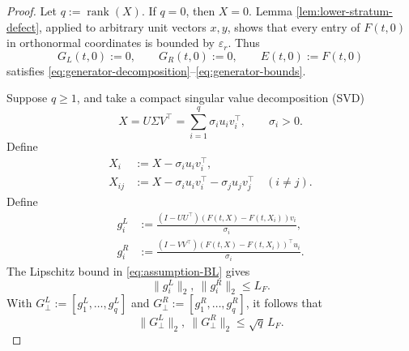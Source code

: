 \documentclass[]{article}
\numberwithin{equation}{section}
\theoremstyle{plain}
\theoremstyle{remark}
\numberwithin{algorithm}{section}
\newcommand{\eps}{\varepsilon}
\newcommand{\rank}{\operatorname{rank}}
\begin{document}
\begin{proof}
Let \(q:=\rank(X)\).  If \(q=0\), then \(X=0\).  Lemma
\ref{lem:lower-stratum-defect}, applied to arbitrary unit vectors \(x,y\),
shows that every entry of \(F(t,0)\) in orthonormal coordinates is bounded
by \(\eps_r\).  Thus
\begin{equation}\label{eq:zero-generator-case}
 G_L(t,0):=0,\qquad G_R(t,0):=0,\qquad E(t,0):=F(t,0)
\end{equation}
satisfies \eqref{eq:generator-decomposition}--\eqref{eq:generator-bounds}.

Suppose \(q\ge1\), and take a compact singular value decomposition (SVD)
\begin{equation}\label{eq:generator-svd}
 X=U\Sigma V^\top
  =\sum_{i=1}^q\sigma_i u_i v_i^\top,
 \qquad \sigma_i>0.
\end{equation}
Define
\begin{align}
 X_i&:=X-\sigma_i u_i v_i^\top,                       \label{eq:delete-one}\\
 X_{ij}&:=X-\sigma_i u_i v_i^\top-\sigma_j u_j v_j^\top
 \quad(i\ne j).                                      \label{eq:delete-two}
\end{align}
Define
\begin{align}
 g_i^L&:=\frac{(I-UU^\top)(F(t,X)-F(t,X_i))v_i}{\sigma_i},
                                                               \label{eq:left-generator-column}\\
 g_i^R&:=\frac{(I-VV^\top)(F(t,X)-F(t,X_i))^\top u_i}{\sigma_i}.
                                                               \label{eq:right-generator-column}
\end{align}
The Lipschitz bound in \eqref{eq:assumption-BL} gives
\begin{equation}\label{eq:normal-generator-bounds}
 \|g_i^L\|_2,\ \|g_i^R\|_2\le L_F.
\end{equation}
With
\(G_\perp^L:=[g_1^L,\ldots,g_q^L]\) and
\(G_\perp^R:=[g_1^R,\ldots,g_q^R]\), it follows that
\begin{equation}\label{eq:normal-generator-matrix-bounds}
 \|G_\perp^L\|_2,\ \|G_\perp^R\|_2\le\sqrt q\,L_F.
\end{equation}


\end{proof}
\end{document}
